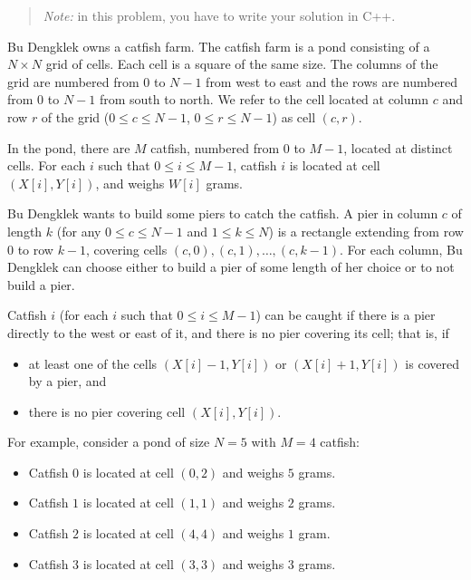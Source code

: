 
\begin{quote}
\textit{Note:} in this problem, you have to write your solution in C++.
\end{quote}

Bu Dengklek owns a catfish farm. The catfish farm is a pond consisting of a $N \times N$ grid of
cells. Each cell is a square of the same size. The columns of the grid are numbered from $0$ to
$N-1$ from west to east and the rows are numbered from $0$ to $N-1$ from south to north. We
refer to the cell located at column $c$ and row $r$ of the grid ($0 \leq c \leq N-1$,
$0 \leq r \leq N-1$) as cell $(c, r)$.

In the pond, there are $M$ catfish, numbered from $0$ to $M-1$, located at distinct cells. For each
$i$ such that $0 \leq i \leq M-1$, catfish $i$ is located at cell $(X[i], Y[i])$, and weighs $W[i]$
grams.

Bu Dengklek wants to build some piers to catch the catfish. A pier in column $c$ of length $k$ (for
any $0 \leq c \leq N-1$ and $1 \leq k \leq N$) is a rectangle extending from row $0$ to row $k-1$,
covering cells $(c, 0), (c, 1), \ldots, (c, k-1)$. For each column, Bu Dengklek can choose either to
build a pier of some length of her choice or to not build a pier.

Catfish $i$ (for each $i$ such that $0 \leq i \leq M-1$) can be caught if there is a pier directly to
the west or east of it, and there is no pier covering its cell; that is, if
\begin{itemize}
  \item at least one of the cells $(X[i]-1, Y[i])$ or $(X[i]+1, Y[i])$ is covered by a pier, and
  \item there is no pier covering cell $(X[i], Y[i])$.
\end{itemize}

For example, consider a pond of size $N = 5$ with $M = 4$ catfish:
\begin{itemize}
  \item Catfish $0$ is located at cell $(0, 2)$ and weighs $5$ grams.
  \item Catfish $1$ is located at cell $(1, 1)$ and weighs $2$ grams.
  \item Catfish $2$ is located at cell $(4, 4)$ and weighs $1$ gram.
  \item Catfish $3$ is located at cell $(3, 3)$ and weighs $3$ grams.
\end{itemize}

